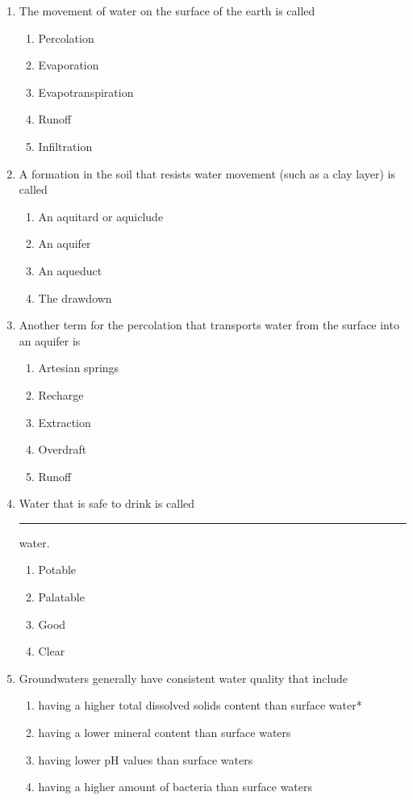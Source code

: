 \begin{enumerate}
\item The movement of water on the surface of the earth is called
\begin{enumerate}
\item Percolation
\item Evaporation
\item Evapotranspiration
\item Runoff
\item Infiltration
\end{enumerate}

\item A formation in the soil that resists water movement (such as a clay layer) is called
\begin{enumerate}
\item An aquitard or aquiclude
\item An aquifer
\item An aqueduct
\item The drawdown
\end{enumerate}

\item Another term for the percolation that transports water from the surface into an aquifer is
\begin{enumerate}
\item Artesian springs
\item Recharge
\item Extraction
\item Overdraft
\item Runoff
\end{enumerate}

\item Water that is safe to drink is called \rule{2cm}{0.3pt} water.
\begin{enumerate}
\item Potable
\item Palatable
\item Good
\item Clear
\end{enumerate}

\item Groundwaters generally have consistent water quality that include
\begin{enumerate}
\item having a higher total dissolved solids content than surface water*
\item having a lower mineral content than surface waters
\item having lower pH values than surface waters
\item having a higher amount of bacteria than surface waters
\end{enumerate}


\end{enumerate}
